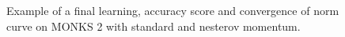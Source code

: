 \begin{appendices}
\begin{figure}[H]
\begin{subfigure}{0.40\textwidth}
                \end{subfigure}
                \begin{subfigure}{0.40\textwidth}
                    \caption{}
                    \label{fig:monks_2_NORM_SGD}
                \end{subfigure}
                \caption{Example of a final learning, accuracy score and convergence of norm curve on MONKS 2 with standard and nesterov momentum.}
                \label{fig:monks_2_SGD}
            \end{figure}


\end{appendices}
